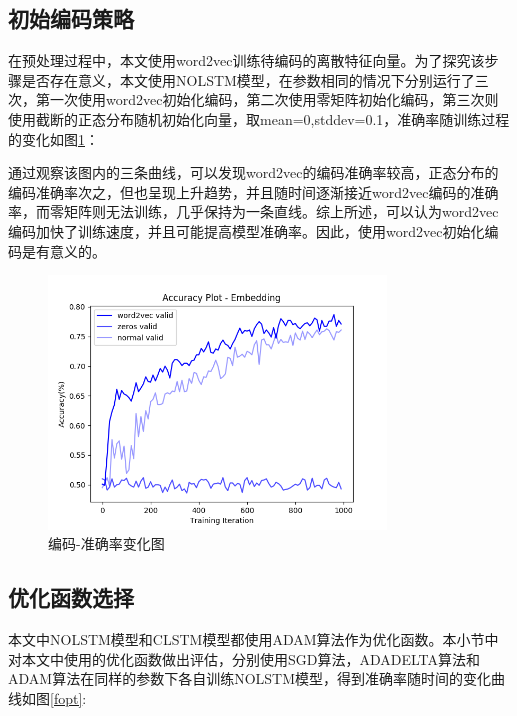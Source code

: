 \subsection{初始编码策略}
在预处理过程中，本文使用word2vec训练待编码的离散特征向量。为了探究该步骤是否存在意义，本文使用NOLSTM模型，在参数相同的情况下分别运行了三次，第一次使用word2vec初始化编码，第二次使用零矩阵初始化编码，第三次则使用截断的正态分布随机初始化向量，取mean=0,stddev=0.1，准确率随训练过程的变化如图\ref{femb}：


通过观察该图内的三条曲线，可以发现word2vec的编码准确率较高，正态分布的编码准确率次之，但也呈现上升趋势，并且随时间逐渐接近word2vec编码的准确率，而零矩阵则无法训练，几乎保持为一条直线。综上所述，可以认为word2vec编码加快了训练速度，并且可能提高模型准确率。因此，使用word2vec初始化编码是有意义的。
\begin{center}
\begin{figure}[!hbp]
\includegraphics[width=0.8\textwidth]{graphic/emb.png}
\caption{编码-准确率变化图 \label{femb}}
\end{figure}
\end{center}
\subsection{优化函数选择}
本文中NOLSTM模型和CLSTM模型都使用ADAM算法作为优化函数。本小节中对本文中使用的优化函数做出评估，分别使用SGD算法，ADADELTA算法和ADAM算法在同样的参数下各自训练NOLSTM模型，得到准确率随时间的变化曲线如图\ref{fopt}:



